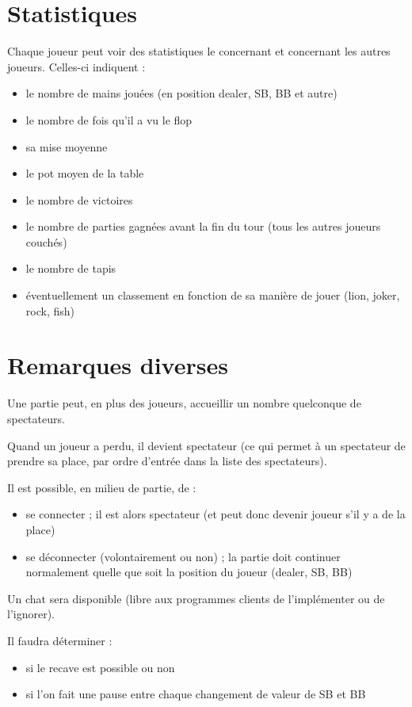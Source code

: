 \section{Statistiques}

Chaque joueur peut voir des statistiques le concernant et concernant les autres joueurs.
Celles-ci indiquent :
\begin{itemize}
	\item le nombre de mains jouées (en position dealer, SB, BB et autre)
	\item le nombre de fois qu'il a vu le flop
	\item sa mise moyenne
	\item le pot moyen de la table
	\item le nombre de victoires
	\item le nombre de parties gagnées avant la fin du tour (tous les autres joueurs couchés)
	\item le nombre de tapis
	\item éventuellement un classement en fonction de sa manière de jouer (lion, joker, rock, fish)
\end{itemize}

\section{Remarques diverses}

Une partie peut, en plus des joueurs, accueillir un nombre quelconque de spectateurs.

Quand un joueur a perdu, il devient spectateur (ce qui permet à un spectateur de prendre sa place, par ordre d'entrée dans la liste des spectateurs).

Il est possible, en milieu de partie, de :
\begin{itemize}
	\item se connecter ; il est alors spectateur (et peut donc devenir joueur s'il y a de la place)
	\item se déconnecter (volontairement ou non) ; la partie doit continuer normalement quelle que soit la position du joueur (dealer, SB, BB)
\end{itemize}

Un chat sera disponible (libre aux programmes clients de l'implémenter ou de l'ignorer).

Il faudra déterminer :
\begin{itemize}
	\item si le recave est possible ou non
	\item si l'on fait une pause entre chaque changement de valeur de SB et BB
\end{itemize}
